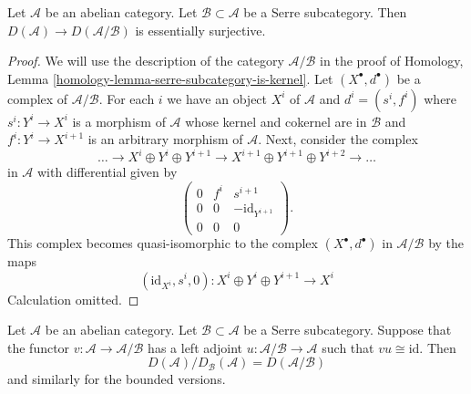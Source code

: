 \begin{lemma}
\label{lemma-derived-of-quotient}
Let $\mathcal{A}$ be an abelian category.
Let $\mathcal{B} \subset \mathcal{A}$ be a Serre subcategory.
Then $D(\mathcal{A}) \to D(\mathcal{A}/\mathcal{B})$
is essentially surjective.
\end{lemma}

\begin{proof}
We will use the description of the category $\mathcal{A}/\mathcal{B}$
in the proof of
Homology, Lemma \ref{homology-lemma-serre-subcategory-is-kernel}.
Let $(X^\bullet, d^\bullet)$ be a complex of $\mathcal{A}/\mathcal{B}$.
For each $i$ we have an object $X^i$ of $\mathcal{A}$ and
$d^i = (s^i, f^i)$ where $s^i : Y^i \to X^i$ is a morphism of $\mathcal{A}$
whose kernel and cokernel are in $\mathcal{B}$ and $f^i : Y^i \to X^{i + 1}$
is an arbitrary morphism of $\mathcal{A}$. Next, consider the complex
$$
\ldots \to
X^i \oplus Y^i \oplus Y^{i + 1} \to
X^{i + 1} \oplus Y^{i + 1} \oplus Y^{i + 2} \to \ldots
$$
in $\mathcal{A}$ with differential given by
$$
\left(
\begin{matrix}
0 & f^i & s^{i + 1} \\
0 & 0 & - \text{id}_{Y^{i + 1}} \\
0 & 0 & 0
\end{matrix}
\right).
$$
This complex becomes quasi-isomorphic to the complex $(X^\bullet, d^\bullet)$
in $\mathcal{A}/\mathcal{B}$ by the maps
$$
(\text{id}_{X^i}, s^i, 0) : X^i \oplus Y^i \oplus Y^{i + 1} \to X^i
$$
Calculation omitted.
\end{proof}

\begin{lemma}
\label{lemma-quotient-by-serre-easy}
Let $\mathcal{A}$ be an abelian category.
Let $\mathcal{B} \subset \mathcal{A}$ be a Serre subcategory.
Suppose that the functor $v : \mathcal{A} \to \mathcal{A}/\mathcal{B}$
has a left adjoint $u : \mathcal{A}/\mathcal{B} \to \mathcal{A}$
such that $vu \cong \text{id}$. Then
$$
D(\mathcal{A})/D_\mathcal{B}(\mathcal{A}) = D(\mathcal{A}/\mathcal{B})
$$
and similarly for the bounded versions.
\end{lemma}

